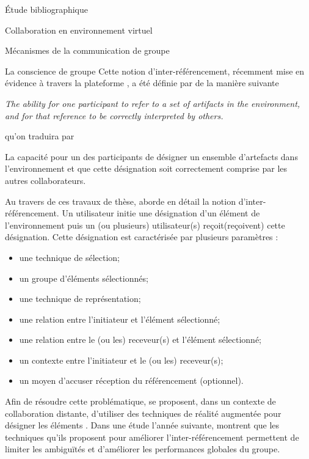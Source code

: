 \documentclass[myfrancais,ngerman,english,frenchb]{mythesis}
\begin{document}
\begin{mychapter}{Étude bibliographique}
\begin{mysection}{Collaboration en environnement virtuel}
\begin{mysubsection}{Mécanismes de la communication de groupe}
\begin{mysubsubsection}{La conscience de groupe}
					Cette notion d'inter-référencement, récemment mise en évidence à travers la plateforme \myAMMPVis {}, a été définie par  de la manière suivante
					\begin{myquote}[english]
						\it The ability for one participant to refer to a set of artifacts in the environment, and for that reference to be correctly interpreted by others.
					\end{myquote}
					qu'on traduira par
					\begin{myquote}[frenchb]
						La capacité pour un des participants de désigner un ensemble d'artefacts dans l'environnement et que cette désignation soit correctement comprise par les autres collaborateurs.
					\end{myquote}

					Au travers de ces travaux de thèse,  aborde en détail la notion d'inter-référencement.
					Un utilisateur initie une désignation d'un élément de l'environnement puis un (ou plusieurs) utilisateur(s) reçoit(reçoivent) cette désignation.
					Cette désignation est caractérisée par plusieurs paramètres :
					\begin{itemize}
						\item une technique de sélection;
						\item un groupe d'éléments sélectionnés;
						\item une technique de représentation;
						\item une relation entre l'initiateur et l'élément sélectionné;
						\item une relation entre le (ou les) receveur(s) et l'élément sélectionné;
						\item un contexte entre l'initiateur et le (ou les) receveur(s);
						\item un moyen d'accuser réception du référencement (optionnel).
					\end{itemize}

					Afin de résoudre cette problématique,  se proposent, dans un contexte de collaboration distante, d'utiliser des techniques de réalité augmentée pour désigner les éléments .
					Dans une étude l'année suivante,  montrent que les techniques qu'ils proposent pour améliorer l'inter-référencement permettent de limiter les ambiguïtés et d'améliorer les performances globales du groupe.


\end{mysubsubsection}
\end{mysubsection}
\end{mysection}
\end{mychapter}
\end{document}
